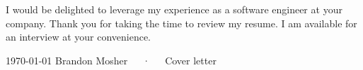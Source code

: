 \documentclass[11pt, a4paper]{coverletter}
\newenvironment{coverletter}{}{}
\begin{document}
\begin{coverletter}
\begin{body}
{\begin{clparagraphs}
\begin{clparagraph}
\end{clparagraph}
\begin{clparagraph}
I would be delighted to leverage my experience as a software engineer at your company. Thank you for taking the time to review my resume. I am available for an interview at your convenience.
\end{clparagraph}
\end{clparagraphs}}
\end{body}
\begin{closing}
%
\makeletterend%
\end{closing}
\begin{enclosures}
%
\end{enclosures}
\end{coverletter}
\makefooter
{\today}
{Brandon Mosher~~~·~~~Cover letter}
{\thepage}
\end{document}

